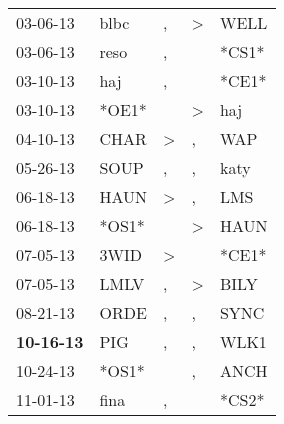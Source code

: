 \begin{supertabular}{p{0.07\textwidth}p{0.06\textwidth}p{0.02\textwidth}p{0.02\textwidth}p{0.06\textwidth}}
          03-06-13\textsuperscript{} &           blbc\textsuperscript{} &                , &     \textgreater &           WELL\textsuperscript{} \\
          03-06-13\textsuperscript{} &           reso\textsuperscript{} &                , &                  &                            *CS1* \\
          03-10-13\textsuperscript{} &            haj\textsuperscript{} &                , &                  &                            *CE1* \\
          03-10-13\textsuperscript{} &                            *OE1* &                  &     \textgreater &            haj\textsuperscript{} \\
          04-10-13\textsuperscript{} &           CHAR\textsuperscript{} &     \textgreater &                , &            WAP\textsuperscript{} \\
          05-26-13\textsuperscript{} &           SOUP\textsuperscript{} &                , &                , &           katy\textsuperscript{} \\
          06-18-13\textsuperscript{} &           HAUN\textsuperscript{} &     \textgreater &                , &            LMS\textsuperscript{} \\
          06-18-13\textsuperscript{} &                            *OS1* &                  &     \textgreater &           HAUN\textsuperscript{} \\
          07-05-13\textsuperscript{} &           3WID\textsuperscript{} &     \textgreater &                  &                            *CE1* \\
          07-05-13\textsuperscript{} &           LMLV\textsuperscript{} &                , &     \textgreater &           BILY\textsuperscript{} \\
          08-21-13\textsuperscript{} &           ORDE\textsuperscript{} &                , &                , &           SYNC\textsuperscript{} \\
 \textbf{10-16-13\textsuperscript{}} &            PIG\textsuperscript{} &                , &                , &           WLK1\textsuperscript{} \\
          10-24-13\textsuperscript{} &                            *OS1* &                  &                , &           ANCH\textsuperscript{} \\
          11-01-13\textsuperscript{} &           fina\textsuperscript{} &                , &                  &                            *CS2* \\

\end{supertabular}
